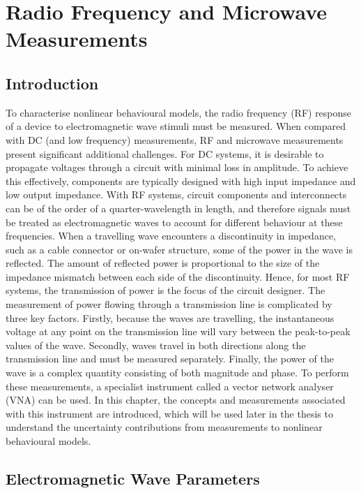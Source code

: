 \documentclass[../thesis/thesis.tex]{subfiles}
\begin{document}
\setcounter{chapter}{1}
\chapter{Radio Frequency and Microwave \\Measurements}
\section{Introduction}

To characterise nonlinear behavioural models, the radio frequency (RF) response of a device to electromagnetic wave stimuli must be measured. When compared with DC (and low frequency) measurements, RF and microwave measurements present significant additional challenges. 
For DC systems, it is desirable to propagate voltages through a circuit with minimal loss in amplitude. To achieve this effectively, components are typically designed with high input impedance and low output impedance. With RF systems, circuit components and interconnects can be of the order of a quarter-wavelength in length, and therefore signals must be treated as electromagnetic waves to account for different behaviour at these frequencies.
When a travelling wave encounters a discontinuity in impedance, such as a cable connector or on-wafer structure, some of the power in the wave is reflected. The amount of reflected power is proportional to the size of the impedance mismatch between each side of the discontinuity. Hence, for most RF systems, the transmission of power is the focus of the circuit designer. The measurement of power flowing through a transmission line is complicated by three key factors. Firstly, because the waves are travelling, the instantaneous voltage at any point on the transmission line will vary between the peak-to-peak values of the wave. Secondly, waves travel in both directions along the transmission line and must be measured separately. Finally, the power of the wave is a complex quantity consisting of both magnitude and phase.
To perform these measurements, a specialist instrument called a vector network analyser (VNA) can be used. In this chapter, the concepts and measurements associated with this instrument are introduced, which will be used later in the thesis to understand the uncertainty contributions from measurements to nonlinear behavioural models.

\section{Electromagnetic Wave Parameters}
\end{document}
